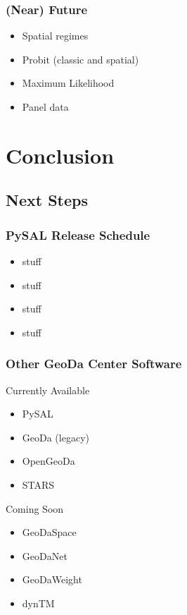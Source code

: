 \documentclass[nototal]{beamer}
\begin{document}
\begin{frame}
	\frametitle{(Near) Future}
 \begin{itemize}
 \item Spatial regimes
 \item Probit (classic and spatial)
 \item Maximum Likelihood
 \item Panel data
 \end{itemize}
 \end{frame} 


\section{Conclusion} 

\subsection{Next Steps} 

\begin{frame}
	\frametitle{PySAL Release Schedule}
 \begin{itemize}
 \item stuff
 \item stuff
 \item stuff
 \item stuff
 \end{itemize}
 \end{frame} 

\begin{frame}
	\frametitle{Other GeoDa Center Software}
 
\begin{block}{Currently Available}
 \begin{itemize}
 \item PySAL
 \item GeoDa (legacy)
 \item OpenGeoDa
 \item STARS
 \end{itemize}
 \end{block} 
\begin{block}{Coming Soon}
 \begin{itemize}
 \item GeoDaSpace
 \item GeoDaNet
 \item GeoDaWeight
 \item dynTM
 \end{itemize}
 \end{block} \end{frame} 
\end{document}
